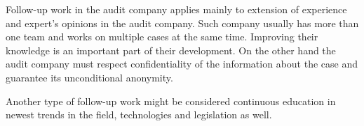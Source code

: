 Follow-up work in the audit company applies mainly to extension of experience and expert's opinions in the audit company. Such company usually has more than one team and works on multiple cases at the same time. Improving their knowledge is an important part of their development. On the other hand the audit company must respect confidentiality of the information about the case and guarantee its unconditional anonymity.

Another type of follow-up work might be considered continuous education in newest trends in the field, technologies and legislation as well.

\colorbox{green}{}

\begin{figure}[h]
	\begin{center} 

\end{center}
\end{figure}
